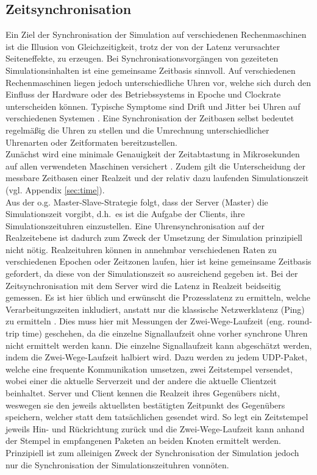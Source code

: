 \subsection{Zeitsynchronisation}
\label{sec:clock}

Ein Ziel der Synchronisation der Simulation auf verschiedenen Rechenmaschinen ist die Illusion von Gleichzeitigkeit, trotz der von der Latenz verursachter Seiteneffekte, zu erzeugen.
Bei Synchronisationsvorgängen von gezeiteten Simulationsinhalten ist eine gemeinsame Zeitbasis sinnvoll.
Auf verschiedenen Rechenmaschinen liegen jedoch unterschiedliche Uhren vor, welche sich durch den Einfluss der Hardware oder des Betriebssystems in Epoche und Clockrate unterscheiden können. Typische Symptome sind Drift und Jitter bei Uhren auf verschiedenen Systemen \cite{Suri00}.
Eine Synchronisation der Zeitbasen selbst bedeutet regelmäßig die Uhren zu stellen und die Umrechnung unterschiedlicher Uhrenarten oder Zeitformaten bereitzustellen.\\
Zunächst wird eine minimale Genauigkeit der Zeitabtastung in Mikrosekunden auf allen verwendeten Maschinen versichert . Zudem gilt die Unterscheidung der messbare Zeitbasen einer Realzeit und der relativ dazu laufenden Simulationszeit (vgl. Appendix \ref{sec:time}).\\
Aus der o.g. Master-Slave-Strategie folgt, dass der Server (Master) die Simulationszeit vorgibt, d.h.~es ist die Aufgabe der Clients, ihre Simulationszeituhren einzustellen. Eine Uhrensynchronisation auf der Realzeitebene ist dadurch zum Zweck der Umsetzung der Simulation prinzipiell nicht nötig. Realzeituhren können in annehmbar verschiedenen Raten zu verschiedenen Epochen oder Zeitzonen laufen, hier ist keine gemeinsame Zeitbasis gefordert, da diese von der Simulationszeit so ausreichend gegeben ist.
Bei der Zeitsynchronisation mit dem Server wird die Latenz in Realzeit beidseitig gemessen. Es ist hier üblich und erwünscht die Prozesslatenz zu ermitteln, welche Verarbeitungszeiten inkludiert, anstatt nur die klassische Netzwerklatenz (Ping) zu ermitteln \cite[p.20]{gamenetworking00}.
Dies muss hier mit Messungen der Zwei-Wege-Laufzeit (eng. round-trip time) geschehen, da die einzelne Signallaufzeit ohne vorher synchrone Uhren nicht ermittelt werden kann. 
Die einzelne Signallaufzeit kann abgeschätzt werden, indem die Zwei-Wege-Laufzeit halbiert wird. Dazu werden zu jedem UDP-Paket, welche eine frequente Kommunikation umsetzen, zwei Zeitstempel versendet, wobei einer die aktuelle Serverzeit und der andere die aktuelle Clientzeit beinhaltet.
Server und Client kennen die Realzeit ihres Gegenübers nicht, weswegen sie den jeweils aktuellsten bestätigten Zeitpunkt des Gegenübers speichern, welcher statt dem tatsächlichen gesendet wird.
So legt ein Zeitstempel jeweils Hin- und Rückrichtung zurück und die Zwei-Wege-Laufzeit kann anhand der Stempel in empfangenen Paketen an beiden Knoten ermittelt werden.\\
Prinzipiell ist zum alleinigen Zweck der Synchronisation der Simulation jedoch nur die Synchronisation der Simulationszeituhren vonnöten.


